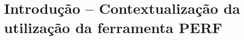 \documentclass[conference,compsoc]{IEEEtran}
\begin{document}
  \maketitle







  \IEEEpeerreviewmaketitle






  \section{Introdução -- Contextualização da utilização da ferramenta PERF}  
  
\end{document}
